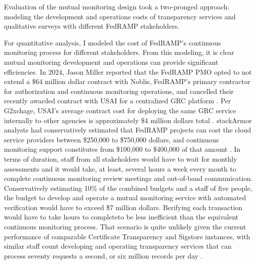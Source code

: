 \documentclass{jdf}
\begin{document}
Evaluation of the mutual monitoring design took a two-pronged approach: modeling the development and operations costs of transparency services and qualitative surveys with different FedRAMP stakeholders.

For quantitative analysis, I modeled the cost of FedRAMP's continuous monitoring process for different stakeholders. From this modeling, it is clear mutual monitoring development and operations can provide significant efficiencies. In 2024, Jason Miller reported that the FedRAMP PMO opted to not extend a \$64 million dollar contract with Noblis, FedRAMP's primary contractor for authorization and continuous monitoring operations, and cancelled their recently awarded contract with USAI for a centralized GRC platform \citeyear{miller25}. Per G2xchage, USAI's average contract cost for deploying the same GRC service internally to other agencies is approximately \$4 million dollars total \citeyear{g2xchange_usai25}. stackArmor analysts had conservatively estimated that FedRAMP projects can cost the cloud service providers between \$250,000 to \$750,000 dollars, and continuous monitoring support constitutes from \$100,000 to \$400,000 of that amount \citeyear{stackarmor24}. In terms of duration, staff from all stakeholders would have to wait for monthly assessments and it would take, at least, several hours a week every month to complete continuous monitoring review meetings and out-of-band communication. Conservatively estimating 10\% of the combined budgets and a staff of five people, the budget to develop and operate a mutual monitoring service with automated verification would have to exceed \$7 million dollars. Berifying each transaction would have to take hours to completeto be less inefficient than the equivalent continuous monitoring process. That scenario is quite unlikely given the current performance of comparable Certificate Transparency and Sigstore instances, with similar  staff count developing and operating transparency services that can process seventy requests a second, or six million records per day \cite{valenta25}.
\end{document}

